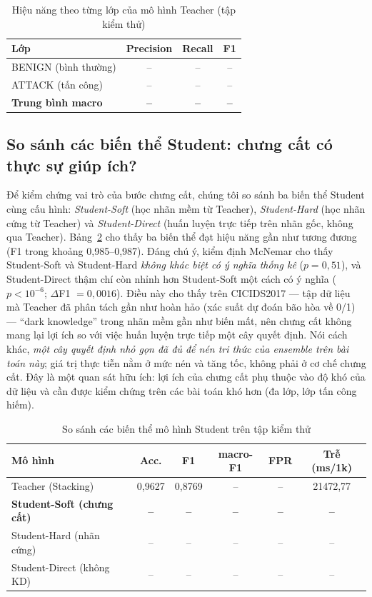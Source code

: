 \begin{table}[!t]
\centering
\caption{Hiệu năng theo từng lớp của mô hình Teacher (tập kiểm thử)}
\label{tab:perclass}
\footnotesize
\begin{tabularx}{\columnwidth}{@{}Xccc@{}}
\toprule
\textbf{Lớp} & \textbf{Precision} & \textbf{Recall} & \textbf{F1} \\
\midrule
BENIGN (bình thường) & -- & -- & -- \\
ATTACK (tấn công) & -- & -- & -- \\
\midrule
\textbf{Trung bình macro} & \textbf{--} & \textbf{--} & \textbf{--} \\
\bottomrule
\end{tabularx}
\end{table}

\subsection{So sánh các biến thể Student: chưng cất có thực sự giúp ích?}
Để kiểm chứng vai trò của bước chưng cất, chúng tôi so sánh ba biến thể Student cùng cấu hình: \emph{Student-Soft} (học nhãn mềm từ Teacher), \emph{Student-Hard} (học nhãn cứng từ Teacher) và \emph{Student-Direct} (huấn luyện trực tiếp trên nhãn gốc, không qua Teacher). Bảng~\ref{tab:student_variants} cho thấy ba biến thể đạt hiệu năng gần như tương đương (F1 trong khoảng 0,985--0,987). Đáng chú ý, kiểm định McNemar cho thấy Student-Soft và Student-Hard \emph{không khác biệt có ý nghĩa thống kê} ($p = 0{,}51$), và Student-Direct thậm chí còn nhỉnh hơn Student-Soft một cách có ý nghĩa ($p < 10^{-6}$; $\Delta$F1 $= 0{,}0016$). Điều này cho thấy trên CICIDS2017 --- tập dữ liệu mà Teacher đã phân tách gần như hoàn hảo (xác suất dự đoán bão hòa về 0/1) --- ``dark knowledge'' trong nhãn mềm gần như biến mất, nên chưng cất không mang lại lợi ích so với việc huấn luyện trực tiếp một cây quyết định. Nói cách khác, \emph{một cây quyết định nhỏ gọn đã đủ để nén tri thức của ensemble trên bài toán này}; giá trị thực tiễn nằm ở mức nén và tăng tốc, không phải ở cơ chế chưng cất. Đây là một quan sát hữu ích: lợi ích của chưng cất phụ thuộc vào độ khó của dữ liệu và cần được kiểm chứng trên các bài toán khó hơn (đa lớp, lớp tấn công hiếm).

\begin{table}[!t]
\centering
\caption{So sánh các biến thể mô hình Student trên tập kiểm thử}
\label{tab:student_variants}
\footnotesize
\begin{tabularx}{\columnwidth}{@{}Xccccc@{}}
\toprule
\textbf{Mô hình} & \textbf{Acc.} & \textbf{F1} & \textbf{macro-F1} & \textbf{FPR} & \textbf{Trễ (ms/1k)} \\
\midrule
Teacher (Stacking) & 0,9627 & 0,8769 & -- & -- & 21472,77 \\
\textbf{Student-Soft (chưng cất)} & \textbf{--} & \textbf{--} & \textbf{--} & \textbf{--} & \textbf{--} \\
Student-Hard (nhãn cứng)          & -- & -- & -- & -- & -- \\
Student-Direct (không KD)         & -- & -- & -- & -- & -- \\
\bottomrule
\end{tabularx}
\end{table}


